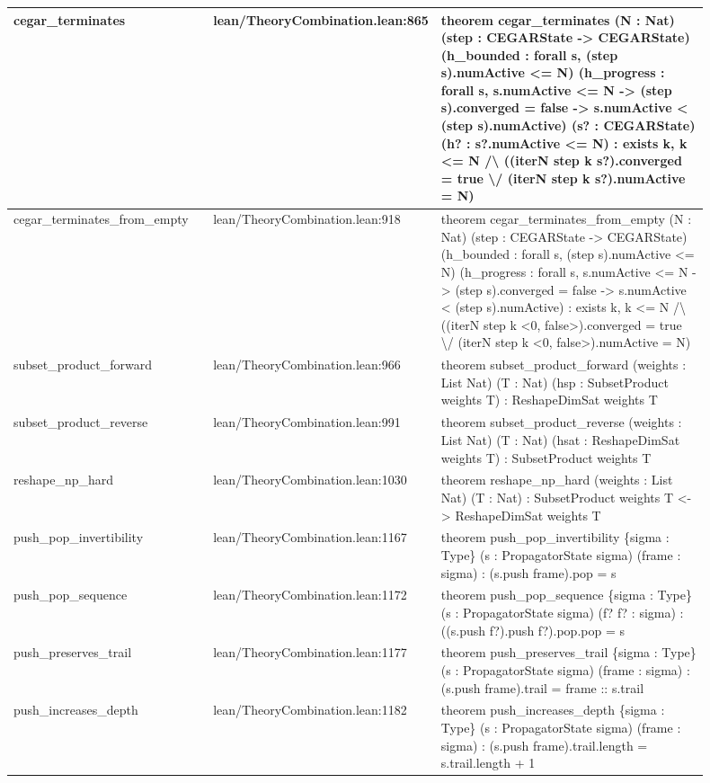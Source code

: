 \documentclass[10pt]{article}
\begin{document}
\begin{longtable}{|p{0.30\linewidth}|p{0.13\linewidth}|p{0.47\linewidth}|}
\hline
cegar\_terminates & lean/TheoryCombination.lean:865 & theorem cegar\_terminates (N : Nat) (step : CEGARState -> CEGARState) (h\_bounded : forall s, (step s).numActive <= N) (h\_progress : forall s, s.numActive <= N -> (step s).converged = false -> s.numActive < (step s).numActive) (s? : CEGARState) (h? : s?.numActive <= N) : exists k, k <= N /\textbackslash{} ((iterN step k s?).converged = true \textbackslash{}/ (iterN step k s?).numActive = N) \\
\hline
cegar\_terminates\_from\_empty & lean/TheoryCombination.lean:918 & theorem cegar\_terminates\_from\_empty (N : Nat) (step : CEGARState -> CEGARState) (h\_bounded : forall s, (step s).numActive <= N) (h\_progress : forall s, s.numActive <= N -> (step s).converged = false -> s.numActive < (step s).numActive) : exists k, k <= N /\textbackslash{} ((iterN step k <0, false>).converged = true \textbackslash{}/ (iterN step k <0, false>).numActive = N) \\
\hline
subset\_product\_forward & lean/TheoryCombination.lean:966 & theorem subset\_product\_forward (weights : List Nat) (T : Nat) (hsp : SubsetProduct weights T) : ReshapeDimSat weights T \\
\hline
subset\_product\_reverse & lean/TheoryCombination.lean:991 & theorem subset\_product\_reverse (weights : List Nat) (T : Nat) (hsat : ReshapeDimSat weights T) : SubsetProduct weights T \\
\hline
reshape\_np\_hard & lean/TheoryCombination.lean:1030 & theorem reshape\_np\_hard (weights : List Nat) (T : Nat) : SubsetProduct weights T <-> ReshapeDimSat weights T \\
\hline
push\_pop\_invertibility & lean/TheoryCombination.lean:1167 & theorem push\_pop\_invertibility \{sigma : Type\} (s : PropagatorState sigma) (frame : sigma) : (s.push frame).pop = s \\
\hline
push\_pop\_sequence & lean/TheoryCombination.lean:1172 & theorem push\_pop\_sequence \{sigma : Type\} (s : PropagatorState sigma) (f? f? : sigma) : ((s.push f?).push f?).pop.pop = s \\
\hline
push\_preserves\_trail & lean/TheoryCombination.lean:1177 & theorem push\_preserves\_trail \{sigma : Type\} (s : PropagatorState sigma) (frame : sigma) : (s.push frame).trail = frame :: s.trail \\
\hline
push\_increases\_depth & lean/TheoryCombination.lean:1182 & theorem push\_increases\_depth \{sigma : Type\} (s : PropagatorState sigma) (frame : sigma) : (s.push frame).trail.length = s.trail.length + 1 \\

\end{longtable}
\end{document}
